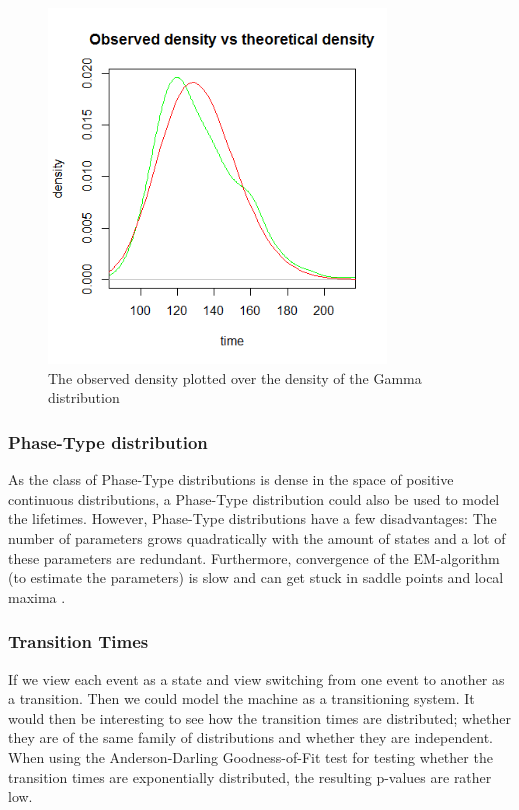 \begin{figure}[H]
\centering
\includegraphics[width=0.8\textwidth]{Plots/LifetimeDensity.png}
\caption{The observed density plotted over the density of the Gamma distribution}
\end{figure}

\subsubsection{Phase-Type distribution}
As the class of Phase-Type distributions is dense in the space of positive continuous distributions, a Phase-Type distribution could also be used to model the lifetimes. However, Phase-Type distributions have a few disadvantages: The number of parameters grows quadratically with the amount of states and a lot of these parameters are redundant. Furthermore, convergence of the EM-algorithm (to estimate the parameters) is slow and can get stuck in saddle points and local maxima \cite{Asmussen1996}.

\subsubsection{Transition Times}
If we view each event as a state and view switching from one event to another as a transition. Then we could model the machine as a transitioning system. It would then be interesting to see how the transition times are distributed; whether they are of the same family of distributions and whether they are independent. \\
When using the Anderson-Darling Goodness-of-Fit test for testing whether the transition times are exponentially distributed, the resulting p-values are rather low. 